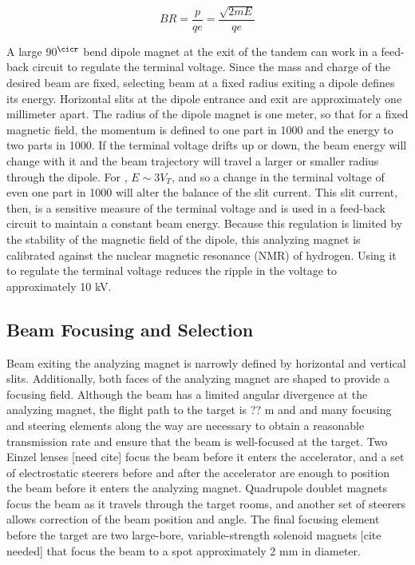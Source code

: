 \begin{equation}
BR = \frac{p}{qe} = \frac{\sqrt{2mE}}{qe}
\label{eqn:rigidity}
\end{equation}

A large 90$^{\cicr}$ bend dipole magnet at the exit of the tandem can work in a feed-back circuit to regulate the terminal voltage.  Since the mass and charge of the desired beam are fixed, selecting beam at a fixed radius exiting a dipole defines its energy.  Horizontal slits at the dipole entrance and exit are approximately one millimeter apart.  The radius of the dipole magnet is one meter, so that for a fixed magnetic field, the momentum is defined to one part in 1000 and the energy to two parts in 1000.  If the terminal voltage drifts up or down, the beam energy will change with it and the beam trajectory will travel a larger or smaller radius through the dipole.  For , $E\sim3V_T$, and so a change in the terminal voltage of even one part in 1000 will alter the balance of the slit current.  This slit current, then, is a sensitive measure of the terminal voltage and is used in a feed-back circuit to maintain a constant beam energy.  Because this regulation is limited by the stability of the magnetic field of the dipole, this analyzing magnet is calibrated against the nuclear magnetic resonance (NMR) of hydrogen.  Using it to regulate the terminal voltage reduces the ripple in the voltage to approximately 10 kV.


\subsection{Beam Focusing and Selection}

Beam exiting the analyzing magnet is narrowly defined by horizontal and vertical slits.  Additionally, both faces of the analyzing magnet are shaped to provide a focusing field.  Although the beam has a limited angular divergence at the analyzing magnet, the flight path to the target is ?? m and and many focusing and steering elements along the way are necessary to obtain a reasonable transmission rate and ensure that the beam is well-focused at the target.  Two Einzel lenses [need cite] focus the beam before it enters the accelerator, and a set of electrostatic steerers before and after the accelerator are enough to position the beam before it enters the analyzing magnet.  Quadrupole doublet magnets focus the beam as it travels through the target rooms, and another set of steerers allows correction of the beam position and angle.  The final focusing element before the target are two large-bore, variable-strength solenoid magnets [cite needed] that focus the beam to a spot approximately 2 mm in diameter.

